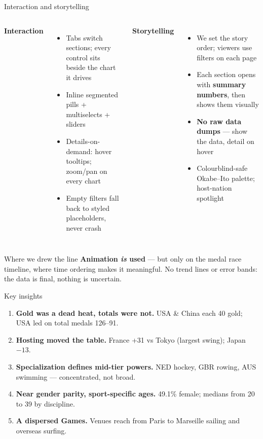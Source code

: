 \documentclass[aspectratio=169,11pt]{beamer}
\newcommand{\teallead}[1]{{\color{teal}\textbf{#1}}}
\begin{document}
\begin{frame}{Interaction and storytelling}
  \small
  \begin{columns}[T]
      \teallead{Interaction}
      \begin{itemize}
        \item Tabs switch sections; every control sits beside the chart it drives
        \item Inline segmented pills + multiselects + sliders
        \item Details-on-demand: hover tooltips; zoom/pan on every chart
        \item Empty filters fall back to styled placeholders, never crash
      \end{itemize}
      \teallead{Storytelling}
      \begin{itemize}
        \item We set the story order; viewers use filters on each page
        \item Each section opens with \textbf{summary numbers}, then shows them visually
        \item \textbf{No raw data dumps} --- show the data, detail on hover
        \item Colourblind-safe Okabe--Ito palette; host-nation spotlight
      \end{itemize}
  \end{columns}
  \vspace{4pt}
  \begin{block}{Where we drew the line}
    \footnotesize \textbf{Animation \emph{is} used} --- but only on the medal
    race timeline, where time ordering makes it meaningful. No trend lines or
    error bands: the data is final, nothing is uncertain.
  \end{block}
\end{frame}

\begin{frame}{Key insights}
  \small
  \begin{enumerate}
    \item \teallead{Gold was a dead heat, totals were not.} USA \& China each 40
      gold; USA led on total medals 126--91.
    \item \teallead{Hosting moved the table.} France +31 vs Tokyo (largest swing);
      Japan $-13$.
    \item \teallead{Specialization defines mid-tier powers.} NED hockey, GBR
      rowing, AUS swimming --- concentrated, not broad.
    \item \teallead{Near gender parity, sport-specific ages.} 49.1\% female;
      medians from 20 to 39 by discipline.
    \item \teallead{A dispersed Games.} Venues reach from Paris to Marseille
      sailing and overseas surfing.
  \end{enumerate}
\end{frame}
\end{document}

